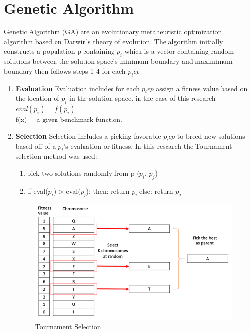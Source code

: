\documentclass[twocolumn]{article}
\begin{document}
\section{Genetic Algorithm}
Genetic Algorithm (GA) are an evolutionary metaheuristic optimization algorithm based on Darwin's theory of evolution. The algorithm initially constructs a population p containing $p_i$ which is a vector containing random solutions between the solution space's minimum boundary and maximimum boundary then follows steps 1-4 for each $p_i \epsilon p$
\begin{enumerate}



    \item \textbf{Evaluation}
Evaluation includes for each $p_i \epsilon p$ assign a fitness value based on the location of $p_i$ in the solution space. in the case of this research $eval(p_i) = f(p_i)$ \\f(x) = a given benchmark function.

    \item \textbf{Selection}
Selection includes a picking favorable $p_i \epsilon p$ to breed new solutions based off of a $p_i$'s evaluation or fitness. In this research the Tournament selection method was used:
		\begin{enumerate} [label=(\alph*)]
        \item pick two solutions randomly from p ($p_i$, $p_j$)
        \item if eval($p_i$) > eval($p_j$): then: return $p_i$
else: return $p_j$
\end{enumerate}

\begin{figure}[!h]
\includegraphics[scale=0.5]{Images/tournament.png}
\caption{Tournament Selection}
\end{figure}



\end{enumerate}
\end{document}
